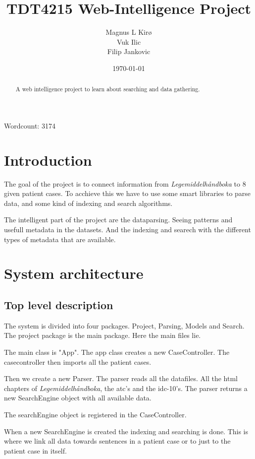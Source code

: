 \documentclass[12pt, a4paper]{article}
\title{
	TDT4215 Web-Intelligence Project
}
\author{
	Magnus L Kirø \\
	Vuk Ilic \\
 	Filip Jankovic \\
}
\date{\today}
\begin{document}
\maketitle
{}

Wordcount: 3174 

\begin{abstract}
A web intelligence project to learn about searching and data gathering. 
\end{abstract}

\newpage
\tableofcontents
\newpage

\section{Introduction}
The goal of the project is to connect information from
\textit{Legemiddelhåndboka} to 8 given patient cases. 
To acchieve this we have to use some smart libraries to parse data, and some
kind of indexing and search algorithms. 

The intelligent part of the project are the dataparsing. Seeing patterns and
usefull metadata in the datasets. And the indexing and searech with the
different types of metadata that are available. 

\section{System architecture} 
\subsection{Top level description}
The system is divided into four packages. Project, Parsing, Models and Search.
The project package is the main package. Here the main files lie. 

The main class is "App". The app class creates a new CaseController.
The casecontroller then imports all the patient cases. 

Then we create a new Parser. The parser reads all the datafiles. All the html
chapters of \textit{Legemiddelhåndboka}, the atc's and the idc-10's. 
The parser returns a new SearchEngine object with all available data. 

The searchEngine object is registered in the CaseController.

When a new SearchEngine is created the indexing and searching is done. 
This is where we link all data towards sentences in a patient case or to just
to the patient case in itself. 
\end{document}
